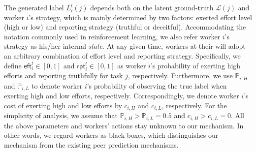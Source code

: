 \documentclass{article}
\begin{document}
The generated label $L^{t}_{i}(j)$ depends both on the latent ground-truth $\mathcal{L}(j)$ and worker $i$'s strategy, which is mainly determined by two factors: exerted effort level (high or low) and reporting strategy (truthful or deceitful).
Accommodating the notation commonly used in reinforcement learning, we also refer worker $i$'s strategy as his/her internal \emph{state}.
At any given time, workers at their will adopt an arbitrary combination of effort level and reporting strategy. Specifically, we define $\textsf{eft}^{t}_i\in[0,1]$ and $\textsf{rpt}^{t}_i\in[0,1]$ as worker $i$'s probability of exerting high efforts and reporting truthfully for task $j$, respectively.
Furthermore, we use $\mathbb{P}_{i,H}$ and $\mathbb{P}_{i,L}$ to denote worker $i$'s probability of observing the true label when exerting high and low efforts, respectively.
Correspondingly, we denote worker $i$'s cost of exerting high and low efforts by $c_{i,H}$ and $c_{i,L}$, respectively.
For the simplicity of analysis, we assume that $\mathbb{P}_{i,H}>\mathbb{P}_{i,L}=0.5$ and $c_{i,H}>c_{i,L}=0$. %
All the above parameters and workers' actions stay unknown to our mechanism.
In other words, we regard workers as black-boxes, which distinguishes our mechanism from the existing peer prediction mechanisms.
\end{document}
